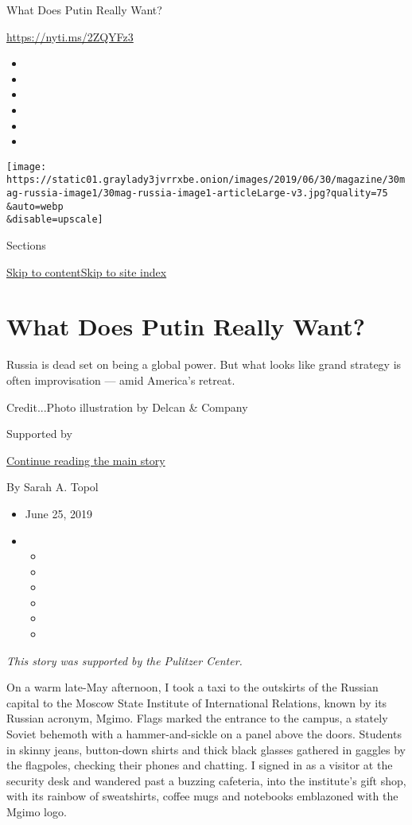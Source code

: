 What Does Putin Really Want?

\url{https://nyti.ms/2ZQYFz3}

\begin{itemize}
\item
\item
\item
\item
\item
\item
\end{itemize}

\texttt{[image: https://static01.graylady3jvrrxbe.onion/images/2019/06/30/magazine/30mag-russia-image1/30mag-russia-image1-articleLarge-v3.jpg?quality=75\\\&auto=webp\\\&disable=upscale]}

Sections

\protect\hyperlink{site-content}{Skip to
content}\protect\hyperlink{site-index}{Skip to site index}

\hypertarget{what-does-putin-really-want}{%
\section{What Does Putin Really
Want?}\label{what-does-putin-really-want}}

Russia is dead set on being a global power. But what looks like grand
strategy is often improvisation --- amid America's retreat.

Credit...Photo illustration by Delcan \& Company

Supported by

\protect\hyperlink{after-sponsor}{Continue reading the main story}

By Sarah A. Topol

\begin{itemize}
\item
  June 25, 2019
\item
  \begin{itemize}
  \item
  \item
  \item
  \item
  \item
  \item
  \end{itemize}
\end{itemize}

\emph{This story was supported by the Pulitzer Center.}

On a warm late-May afternoon, I took a taxi to the outskirts of the
Russian capital to the Moscow State Institute of International
Relations, known by its Russian acronym, Mgimo. Flags marked the
entrance to the campus, a stately Soviet behemoth with a
hammer-and-sickle on a panel above the doors. Students in skinny jeans,
button-down shirts and thick black glasses gathered in gaggles by the
flagpoles, checking their phones and chatting. I signed in as a visitor
at the security desk and wandered past a buzzing cafeteria, into the
institute's gift shop, with its rainbow of sweatshirts, coffee mugs and
notebooks emblazoned with the Mgimo logo.

